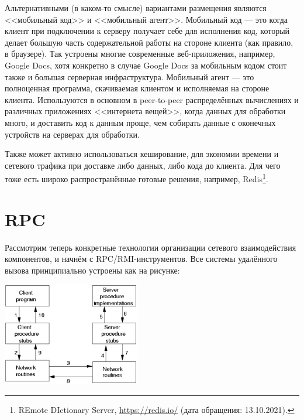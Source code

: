 \documentclass{../../text-style}
\begin{document}
Альтернативными (в каком-то смысле) вариантами размещения являются <<мобильный код>> и <<мобильный агент>>. Мобильный код --- это когда клиент при подключении к серверу получает себе для исполнения код, который делает большую часть содержательной работы на стороне клиента (как правило, в браузере). Так устроены многие современные веб-приложения, например, Google Docs, хотя конкретно в случае Google Docs за мобильным кодом стоит также и большая серверная инфраструктура. Мобильный агент --- это полноценная программа, скачиваемая клиентом и исполняемая на стороне клиента. Используются в основном в peer-to-peer распределённых вычислениях и различных приложениях <<интернета вещей>>, когда данных для обработки много, и доставить код к данным проще, чем собирать данные с оконечных устройств на серверах для обработки.

Также может активно использоваться кеширование, для экономии времени и сетевого трафика при доставке либо данных, либо кода до клиента. Для чего тоже есть широко распространённые готовые решения, например, Redis\footnote{REmote DIctionary Server, \url{https://redis.io/} (дата обращения: 13.10.2021).}.

\section{RPC}

Рассмотрим теперь конкретные технологии организации сетевого взаимодействия компонентов, и начнём с RPC/RMI-инструментов. Все системы удалённого вызова принципиально устроены как на рисунке:

\begin{center}
    \includegraphics[width=0.45\textwidth]{rpc.png}
\end{center}
\end{document}
